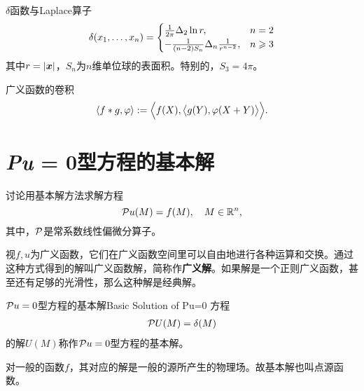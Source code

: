 \begin{example}{$\delta$函数与Laplace算子}{}
	\begin{equation}
		\delta(x_1,\ldots,x_n)=\begin{cases}
			\frac1{2\pi}\Delta_2\ln r,&n=2\\
			-\frac1{(n-2)S_{n}}\Delta_n\frac1{r^{n-2}},&n\geqslant 3
		\end{cases}
	\end{equation}
	其中$r=\left\lvert\bm x\right\rvert$，$S_n$为$n$维单位球的表面积。特别的，$S_3=4\pi$。
\end{example}
广义函数的卷积
\[
	\left\langle f\ast g,\varphi\right\rangle:=\Bigl\langle f(X),\bigl\langle g(Y),\varphi(X+Y)\bigr\rangle\Bigr\rangle.
\]

\section{\textit{Pu} = 0型方程的基本解} %
讨论用基本解方法求解方程
\[
	\mathcal P u(M)=f(M),\quad M\in\mathbb R^n,
\]
其中，$\mathcal P$是常系数线性偏微分算子。

视$f,u$为广义函数，它们在广义函数空间里可以自由地进行各种运算和交换。通过这种方式得到的解叫广义函数解，简称作\textbf{广义解}。如果解是一个正则广义函数，甚至还有足够的光滑性，那么这种解是经典解。
\begin{definition}{$\mathcal P u=0$型方程的基本解}{Basic Solution of Pu=0}
	方程
	\begin{align}
		\mathcal P U(M)=\mathop{}\!\delta(M)
	\end{align}
	的解$U(M)$称作$\mathcal P u=0$型方程的基本解。
\end{definition}
对一般的函数$f$，其对应的解是一般的源所产生的物理场。故基本解也叫点源函数。

